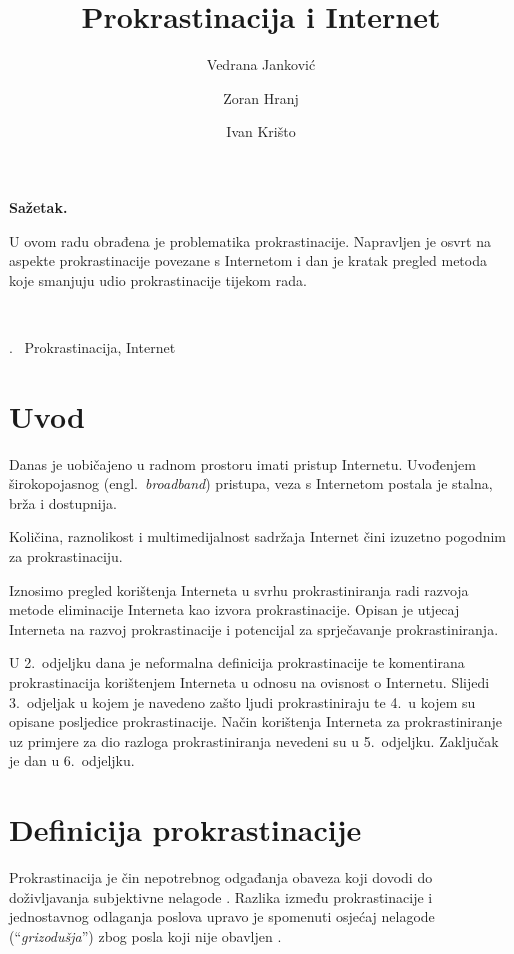 \documentclass[11pt,twocolumn,english]{article}
\let\LaTeXtitle\title
\renewcommand{\title}[1]{\LaTeXtitle{\Large \textbf{#1}}}
\renewenvironment{abstract}
{\noindent \large \bf Sažetak.\normalsize\begin{it}}
{\end{it}\\}
\newenvironment{keywords}
{\noindent {\large {\bf Ključne riječi}}.~}{}
\newcommand{\engl}[1]{(engl.~\emph{#1})}
\begin{document}
\title{Prokrastinacija i Internet}
\author{Vedrana Janković}
\author{Zoran Hranj}
\author{Ivan Krišto}

\date{}

\maketitle
\thispagestyle{empty}
\pagestyle{empty}

\begin{abstract}
U ovom radu obrađena je problematika prokrastinacije. Napravljen je 
osvrt na aspekte prokrastinacije povezane s Internetom i dan je kratak 
pregled metoda koje smanjuju udio prokrastinacije tijekom rada.
\end{abstract}

\begin{keywords}
Prokrastinacija, Internet
\end{keywords}

\section{Uvod}
Danas je uobičajeno u radnom prostoru imati pristup Internetu. Uvođenjem
širokopojasnog \engl{broadband} pristupa, veza s Internetom postala je stalna,
brža i dostupnija.

Količina, raznolikost i multimedijalnost sadržaja Internet čini izuzetno
pogodnim za prokrastinaciju.

Iznosimo pregled korištenja Interneta u svrhu prokrastiniranja radi razvoja
metode eliminacije Interneta kao izvora prokrastinacije. Opisan je utjecaj 
Interneta na razvoj prokrastinacije i potencijal za sprječavanje prokrastiniranja.

U 2.~odjeljku dana je neformalna definicija prokrastinacije te komentirana
prokrastinacija korištenjem Interneta u odnosu na ovisnost o Internetu. Slijedi
3.~odjeljak u kojem je navedeno zašto ljudi prokrastiniraju te 4.~u kojem su
opisane posljedice prokrastinacije. Način korištenja Interneta za
prokrastiniranje uz primjere za dio razloga prokrastiniranja nevedeni su u
5.~odjeljku. Zaključak je dan u 6.~odjeljku.

\section{Definicija prokrastinacije}
Prokrastinacija je čin nepotrebnog odgađanja obaveza koji dovodi do 
doživljavanja subjektivne nelagode \cite{solomon1984academic}. Razlika između
prokrastinacije i jednostavnog odlaganja poslova upravo je spomenuti osjećaj
nelagode (``\emph{grizodušja}'') zbog posla koji nije obavljen
\cite{burka2004procrastination}.
\end{document}
